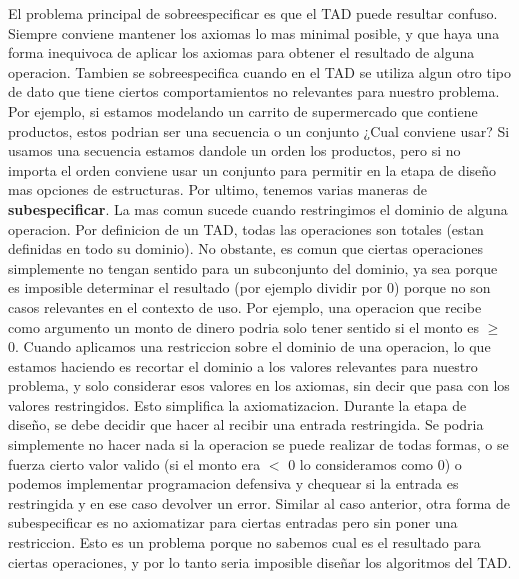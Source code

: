 \documentclass[10pt,a4paper]{article}
\begin{document}
\newline
\newline
El problema principal de sobreespecificar es que el TAD puede resultar confuso. Siempre conviene mantener los axiomas lo mas minimal posible, y que haya una forma inequivoca de aplicar los axiomas para obtener el resultado de alguna operacion.
\newline
\newline
Tambien se sobreespecifica cuando en el TAD se utiliza algun otro tipo de dato que tiene ciertos comportamientos no relevantes para nuestro problema. Por ejemplo, si estamos modelando un carrito de supermercado que contiene productos, estos podrian ser una secuencia o un conjunto ¿Cual conviene usar? Si usamos una secuencia estamos dandole un orden los productos, pero si no importa el orden conviene usar un conjunto para permitir en la etapa de diseño mas opciones de estructuras.
\newline
\newline
Por ultimo, tenemos varias maneras de \textbf{subespecificar}. La mas comun sucede cuando restringimos el dominio de alguna operacion. Por definicion de un TAD, todas las operaciones son totales (estan definidas en todo su dominio). No obstante, es comun que ciertas operaciones simplemente no tengan sentido para un subconjunto del dominio, ya sea porque es imposible determinar el resultado (por ejemplo dividir por 0) porque no son casos relevantes en el contexto de uso. Por ejemplo, una operacion que recibe como argumento un monto de dinero podria solo tener sentido si el monto es $\geq$ 0. 
\newline
\newline
Cuando aplicamos una restriccion sobre el dominio de una operacion, lo que estamos haciendo es recortar el dominio a los valores relevantes para nuestro problema, y solo considerar esos valores en los axiomas, sin decir que pasa con los valores restringidos. Esto simplifica la axiomatizacion. Durante la etapa de diseño, se debe decidir que hacer al recibir una entrada restringida. Se podria simplemente no hacer nada si la operacion se puede realizar de todas formas, o se fuerza cierto valor valido (si el monto era $<$ 0 lo consideramos como 0) o podemos implementar programacion defensiva y chequear si la entrada es restringida y en ese caso devolver un error.   
\newline
\newline
Similar al caso anterior, otra forma de subespecificar es no axiomatizar para ciertas entradas pero sin poner una restriccion. Esto es un problema porque no sabemos cual es el resultado para ciertas operaciones, y por lo tanto seria imposible diseñar los algoritmos del TAD.
\end{document}
